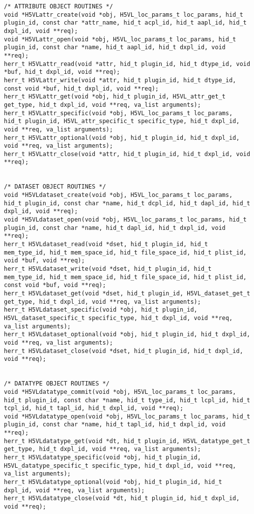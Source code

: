 \begin{appendices}
\begin{lstlisting}
/* ATTRIBUTE OBJECT ROUTINES */
void *H5VLattr_create(void *obj, H5VL_loc_params_t loc_params, hid_t plugin_id, const char *attr_name, hid_t acpl_id, hid_t aapl_id, hid_t dxpl_id, void **req);
void *H5VLattr_open(void *obj, H5VL_loc_params_t loc_params, hid_t plugin_id, const char *name, hid_t aapl_id, hid_t dxpl_id, void **req);
herr_t H5VLattr_read(void *attr, hid_t plugin_id, hid_t dtype_id, void *buf, hid_t dxpl_id, void **req);
herr_t H5VLattr_write(void *attr, hid_t plugin_id, hid_t dtype_id, const void *buf, hid_t dxpl_id, void **req);
herr_t H5VLattr_get(void *obj, hid_t plugin_id, H5VL_attr_get_t get_type, hid_t dxpl_id, void **req, va_list arguments);
herr_t H5VLattr_specific(void *obj, H5VL_loc_params_t loc_params, hid_t plugin_id, H5VL_attr_specific_t specific_type, hid_t dxpl_id, void **req, va_list arguments);
herr_t H5VLattr_optional(void *obj, hid_t plugin_id, hid_t dxpl_id, void **req, va_list arguments);
herr_t H5VLattr_close(void *attr, hid_t plugin_id, hid_t dxpl_id, void **req);


/* DATASET OBJECT ROUTINES */
void *H5VLdataset_create(void *obj, H5VL_loc_params_t loc_params, hid_t plugin_id, const char *name, hid_t dcpl_id, hid_t dapl_id, hid_t dxpl_id, void **req);
void *H5VLdataset_open(void *obj, H5VL_loc_params_t loc_params, hid_t plugin_id, const char *name, hid_t dapl_id, hid_t dxpl_id, void **req);
herr_t H5VLdataset_read(void *dset, hid_t plugin_id, hid_t mem_type_id, hid_t mem_space_id, hid_t file_space_id, hid_t plist_id, void *buf, void **req);
herr_t H5VLdataset_write(void *dset, hid_t plugin_id, hid_t mem_type_id, hid_t mem_space_id, hid_t file_space_id, hid_t plist_id, const void *buf, void **req);
herr_t H5VLdataset_get(void *dset, hid_t plugin_id, H5VL_dataset_get_t get_type, hid_t dxpl_id, void **req, va_list arguments);
herr_t H5VLdataset_specific(void *obj, hid_t plugin_id, H5VL_dataset_specific_t specific_type, hid_t dxpl_id, void **req, va_list arguments);
herr_t H5VLdataset_optional(void *obj, hid_t plugin_id, hid_t dxpl_id, void **req, va_list arguments);
herr_t H5VLdataset_close(void *dset, hid_t plugin_id, hid_t dxpl_id, void **req);


/* DATATYPE OBJECT ROUTINES */
void *H5VLdatatype_commit(void *obj, H5VL_loc_params_t loc_params, hid_t plugin_id, const char *name, hid_t type_id, hid_t lcpl_id, hid_t tcpl_id, hid_t tapl_id, hid_t dxpl_id, void **req);
void *H5VLdatatype_open(void *obj, H5VL_loc_params_t loc_params, hid_t plugin_id, const char *name, hid_t tapl_id, hid_t dxpl_id, void **req);
herr_t H5VLdatatype_get(void *dt, hid_t plugin_id, H5VL_datatype_get_t get_type, hid_t dxpl_id, void **req, va_list arguments);
herr_t H5VLdatatype_specific(void *obj, hid_t plugin_id, H5VL_datatype_specific_t specific_type, hid_t dxpl_id, void **req, va_list arguments);
herr_t H5VLdatatype_optional(void *obj, hid_t plugin_id, hid_t dxpl_id, void **req, va_list arguments);
herr_t H5VLdatatype_close(void *dt, hid_t plugin_id, hid_t dxpl_id, void **req);



\end{lstlisting}
\end{appendices}
